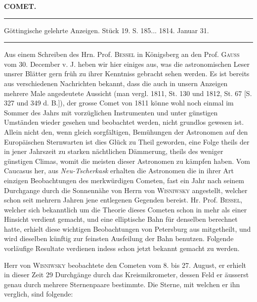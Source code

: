 \clearpage{}\hypertarget{native-378-lower}{}\label{native-378-lower}
\begin{center}\textbf{COMET.}\par\vspace{4pt}\hrule\vspace{4pt}\fontsize{10}{12}\selectfont Göttingische gelehrte Anzeigen. Stück 19. S. 185\;... 1814. Januar 31.\par\vspace{4pt}\hrule\vspace{4pt}\end{center}

\par\indent Aus einem Schreiben des Hrn. Prof. \textsc{Bessel} in Königsberg an den Prof. \textsc{Gauss} vom 30. December v. J. heben wir hier einiges aus, was die astronomischen Leser unsrer Blätter gern früh zu ihrer Kenntniss gebracht sehen werden. Es ist bereits aus verschiedenen Nachrichten bekannt, dass die auch in unsern Anzeigen mehrere Male angedeutete Aussicht (man vergl. 1811, St. 130 und 1812, St. 67 [S. 327 und 349 d. B.]), der grosse Comet von 1811 könne wohl noch einmal im Sommer des Jahrs mit vorzüglichen Instrumenten und unter günstigen Umständen wieder gesehen und beobachtet werden, nicht grundlos gewesen ist. Allein nicht den, wenn gleich sorgfältigen, Bemühungen der Astronomen auf den Europäischen Sternwarten ist dies Glück zu Theil geworden, eine Folge theils der in jener Jahrszeit zu starken nächtlichen Dämmerung, theils des weniger günstigen Climas, womit die meisten dieser Astronomen zu kämpfen haben. Vom Caucasus her, aus \emph{Neu-Tscherkask} erhalten die Astronomen die in ihrer Art einzigen Beobachtungen des merkwürdigen Cometen, fast ein Jahr nach seinem Durchgange durch die Sonnennähe von Herrn von \textsc{Wisniwsky} angestellt, welcher schon seit mehrern Jahren jene entlegenen Gegenden bereist. Hr. Prof. \textsc{Bessel}, welcher sich bekanntlich um die Theorie dieses Cometen schon in mehr als einer Hinsicht verdient gemacht, und eine elliptische Bahn für denselben berechnet hatte, erhielt diese wichtigen Beobachtungen von Petersburg aus mitgetheilt, und wird dieselben künftig zur feinsten Ausfeilung der Bahn benutzen. Folgende vorläufige Resultate verdienen indess schon jetzt bekannt gemacht zu werden.

\par\indent Herr von \textsc{Wisniwsky} beobachtete den Cometen vom 8. bis 27. August, er erhielt in dieser Zeit 29 Durchgänge durch das Kreismikrometer, dessen Feld er äusserst genau durch mehrere Sternenpaare bestimmte. Die Sterne, mit welchen er ihn verglich, sind folgende:

